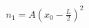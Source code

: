 \documentclass[preview]{standalone}
\begin{document}
\begin{align*}
n_1 = A\!\left(x_0 - \tfrac{L}{2}\right)^2
\end{align*}
\end{document}
